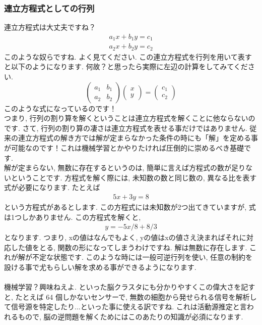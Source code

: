 \documentclass[11pt,a4paper]{jsarticle}
\begin{document}
\subsubsection{連立方程式としての行列}
連立方程式は大丈夫ですね？
\begin{eqnarray}
a_1x + b_1y = c_1
\end{eqnarray}
\begin{eqnarray}
a_2x + b_2y = c_2
\end{eqnarray}
このような奴らですね. よく見てください. この連立方程式を行列を用いて表すと以下のようになります. 何故？と思ったら実際に左辺の計算をしてみてください. 
\[
  \left(	
  \begin{array}{cc}
  a_1 & b_1 \\
  a_2 & b_2
  \end{array}
  \right)
  \left(
  \begin{array}{c}
  x \\
  y
  \end{array}
  \right)
  =
  \left(
  \begin{array}{l}
  c_1\\
  c_2
  \end{array}
  \right)
\]
このような式になっているのです！\\
つまり, 行列の割り算を解くということは連立方程式を解くことに他ならないのです. 
さて, 行列の割り算の凄さは連立方程式を表せる事だけではありません. 従来の連立方程式の解き方では解が定まらなかった条件の時にも「解」を定める事が可能なのです！これは機械学習とかやりたければ圧倒的に崇めるべき基礎です.\\
解が定まらない, 無数に存在するというのは, 簡単に言えば方程式の数が足りないということです. 方程式を解く際には, 未知数の数と同じ数の, 異なる比を表す式が必要になります. たとえば
\begin{eqnarray}
5x + 3y = 8
\end{eqnarray}
という方程式があるとします. この方程式には未知数が2つ出てきていますが, 式は1つしかありません. この方程式を解くと, 
\begin{eqnarray}
y = -5x/8 + 8/3
\end{eqnarray}
となります. つまり, xの値はなんでもよく, yの値はxの値さえ決まればそれに対応した値をとる, 関数の形になってしまうわけですね. 解は無数に存在します. これが解が不定な状態です. このような時には一般可逆行列を使い, 任意の制約を設ける事で尤もらしい解を求める事ができるようになります.\\
\\
機械学習？興味ねえよ. といった脳クラスタにも分かりやすくこの偉大さを記すと, たとえば 64 個しかないセンサーで, 無数の細胞から発せられる信号を解析して信号源を特定したり...といった事に使える訳ですね. これは活動源推定と言われるもので, 脳の逆問題を解くためにはこのあたりの知識が必須になります.
 
\end{document}
